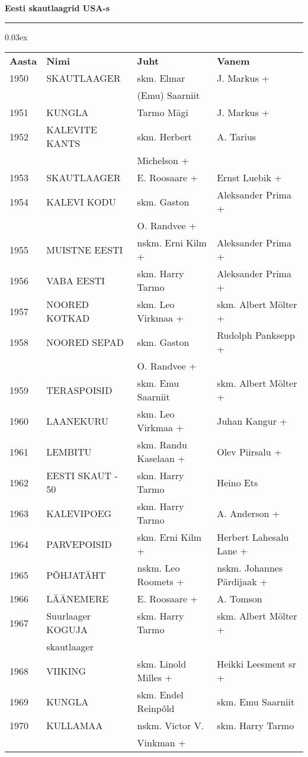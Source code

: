 \documentclass[10pt]{book}
\begin{document}
\centerline{ {\bf {\large Eesti  skautlaagrid  USA-s}}}
\vspace{0.1in}
\hrule height 0.05ex
{\centering\scriptsize\arrayrulewidth 0.03ex
\begin{tabular*}{1.0\textwidth}{@{\extracolsep{\fill}}@{}l@{}@{}l@{}@{}l@{}@{}l@{}}
\bf{Aasta}	&	\bf{Nimi}				&	\bf{Juht}				&	\bf{Vanem}\\[2mm]
	1950	&	SKAUTLAAGER				&	skm. Elmar 				&	J. Markus +\\
			&							&	(Emu) Saarniit			&	\\[2mm]
	1951	&	KUNGLA					&	Tarmo M\"agi			&	J. Markus +\\[2mm]
	1952	&	KALEVITE KANTS			&	skm. Herbert 			&	A. Tarius\\
			&							&	Michelson +				&	\\[2mm]
	1953	&	SKAUTLAAGER				&	E. Roosaare +			&	Ernst Luebik +\\[2mm]
	1954	&	KALEVI KODU				&	skm. Gaston 			&	Aleksander Prima +\\
			&							&	O. Randvee +			&	\\[2mm]
	1955	&	MUISTNE EESTI			&	nskm. Erni Kilm +		&	Aleksander Prima +\\[2mm]
	1956	&	VABA EESTI				&	skm. Harry Tarmo		&	Aleksander Prima +\\[2mm]
	1957	&	NOORED KOTKAD			&	skm. Leo Virkmaa +		&	skm. Albert M\"olter +\\[2mm]
	1958	&	NOORED SEPAD			&	skm. Gaston 			&	Rudolph Panksepp +\\
			&							&	O. Randvee +			&	\\[2mm]
	1959	&	TERASPOISID				&	skm. Emu Saarniit		&	skm. Albert M\"olter +\\[2mm]
	1960	&	LAANEKURU				&	skm.  Leo Virkmaa +		&	Juhan Kangur +\\[2mm]
	1961	&	LEMBITU					&	skm. Randu Kaselaan +	&	Olev Piirsalu +\\[2mm]
	1962	&	EESTI SKAUT - 50		&	skm. Harry Tarmo		&	Heino Ets\\[2mm]
	1963	&	KALEVIPOEG				&	skm. Harry Tarmo		&	A. Anderson +\\[2mm]
	1964	&	PARVEPOISID				&	skm. Erni Kilm +		&	Herbert Lahesalu Lane +\\[2mm]
	1965	&	P\~OHJAT\"AHT			&	nskm. Leo Roomets +		&	nskm. Johannes P\"ardijaak +\\[2mm]
	1966	&	L\"A\"ANEMERE			&	E. Roosaare +			&	A. Tomson\\[2mm]
	1967	&	Suurlaager KOGUJA		&	skm. Harry Tarmo		&	skm. Albert M\"olter +\\
			&	skautlaager				&							&	\\[2mm]
	1968	&	VIIKING					&	skm. Linold Milles +	&	Heikki Leesment sr +\\[2mm]
	1969	&	KUNGLA					&	skm. Endel Reinp\~old	&	skm. Emu Saarniit\\[2mm]
	1970	&	KULLAMAA				&	nskm. Victor V. 		&	skm. Harry Tarmo\\
			&							&	Vinkman +				&	\\[2mm]
\end{tabular*}}
\end{document}
